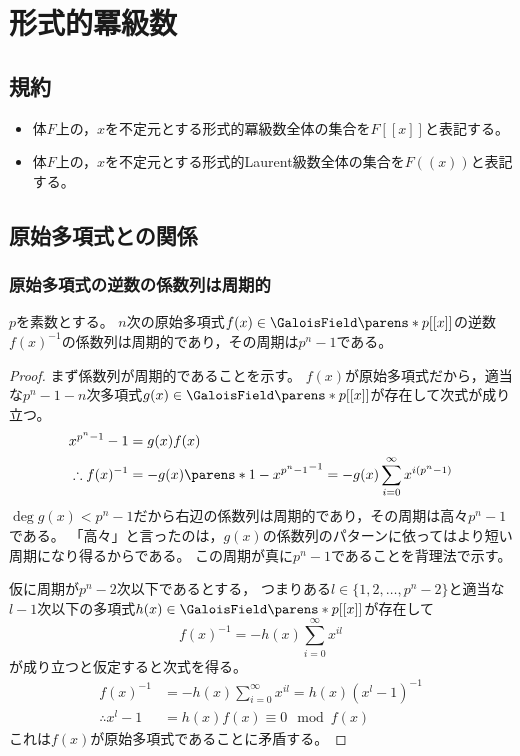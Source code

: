 \chapter{形式的冪級数}
    \section{規約}
        \begin{itemize}
            \item 体$F$上の，$x$を不定元とする形式的冪級数全体の集合を$F[[x]]$と表記する。
            \item 体$F$上の，$x$を不定元とする形式的Laurent級数全体の集合を$F((x))$と表記する。
        \end{itemize}
    \section{原始多項式との関係}
        \subsection{原始多項式の逆数の係数列は周期的}
            \label{原始多項式の逆数の係数列は周期的}
            \begin{shadebox}
                $p$を素数とする。
                $n$次の原始多項式$f(x) \in \GaloisField\parens*{p}[[x]]$の逆数$f(x)^{-1}$の係数列は周期的であり，その周期は$p^n-1$である。
            \end{shadebox}
            \begin{proof}
                まず係数列が周期的であることを示す。
                $f(x)$が原始多項式だから，適当な$p^n-1-n$次多項式$g(x) \in \GaloisField\parens*{p}[[x]]$が存在して次式が成り立つ。
                \begin{align*}
                    x^{p^n-1} - 1 &= g(x)f(x) \\
                    \therefore f(x)^{-1} &= -g(x)\parens*{1 - x^{p^n-1}}^{-1} = -g(x) \sum_{i=0}^\infty x^{i(p^n-1)}
                \end{align*}
                $\deg{g(x)} < p^n - 1$だから右辺の係数列は周期的であり，その周期は高々$p^n-1$である。
                「高々」と言ったのは，$g(x)$の係数列のパターンに依ってはより短い周期になり得るからである。
                この周期が真に$p^n-1$であることを背理法で示す。
                \par
                仮に周期が$p^n-2$次以下であるとする，
                つまりある$l\in\{1,2,\dotsc,p^n-2\}$と適当な$l-1$次以下の多項式$h(x) \in \GaloisField\parens*{p}[[x]]$が存在して
                \[ f(x)^{-1} = -h(x) \sum_{i=0}^\infty x^{il} \]
                が成り立つと仮定すると次式を得る。
                \begin{align*}
                    f(x)^{-1} &= -h(x) \sum_{i=0}^\infty x^{il} = h(x)(x^l - 1)^{-1} \\
                    \therefore x^l - 1 &= h(x)f(x) \equiv 0 \mod f(x)
                \end{align*}
                これは$f(x)$が原始多項式であることに矛盾する。
            \end{proof}
